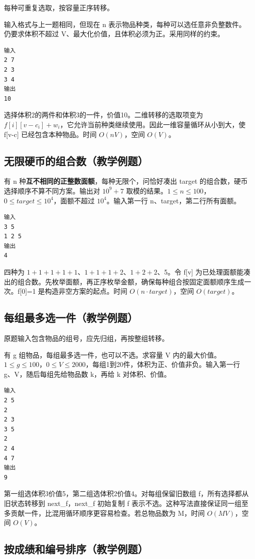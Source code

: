 每种可重复选取，按容量正序转移。

输入格式与上一题相同，但现在 n 表示物品种类，每种可以选任意非负整数件。仍要求体积不超过 V、最大化价值，且体积必须为正。采用同样的约束。
\begin{verbatim}
输入
2 7
2 3
3 4
输出
10
\end{verbatim}
选择体积2的两件和体积3的一件，价值10。二维转移的选取项变为 $f[i][v-c_i]+w_i$，它允许当前种类继续使用。因此一维容量循环从小到大，使 f[v-c] 已经包含本种物品。时间 $O(nV)$，空间 $O(V)$。
\subsection{无限硬币的组合数（教学例题）}

有 n 种\textbf{互不相同的正整数面额}，每种无限个，问恰好凑出 target 的组合数，硬币选择顺序不算不同方案。输出对 $10^9+7$ 取模的结果。$1\le n\le100$，$0\le target\le10^4$，面额不超过 $10^4$。输入第一行 n、target，第二行所有面额。
\begin{verbatim}
输入
3 5
1 2 5
输出
4
\end{verbatim}
四种为 $1+1+1+1+1$、$1+1+1+2$、$1+2+2$、5。令 f[v] 为已处理面额能凑出的组合数。先枚举面额，再正序枚举金额，确保每种组合按固定面额顺序生成一次。f[0]=1 是构造非空方案的起点。时间 $O(n\cdot target)$，空间 $O(target)$。
\subsection{每组最多选一件（教学例题）}

原题输入包含物品的组号，应先归组，再按整组转移。

有 g 组物品，每组最多选一件，也可以不选。求容量 V 内的最大价值。$1\le g\le100$，$0\le V\le2000$，每组1到20件，体积为正、价值非负。输入第一行 g、V，随后每组先给物品数 k，再给 k 对体积、价值。
\begin{verbatim}
输入
2 5
2
2 3
3 5
2
2 4
4 7
输出
9
\end{verbatim}
第一组选体积3价值5，第二组选体积2价值4。对每组保留旧数组 f，所有选择都从旧状态转移到 next\_f，next\_f 初始复制 f 表示不选。这种写法直接保证同一组至多贡献一件，比混用循环顺序更容易检查。若总物品数为 M，时间 $O(MV)$，空间 $O(V)$。
\subsection{按成绩和编号排序（教学例题）}

